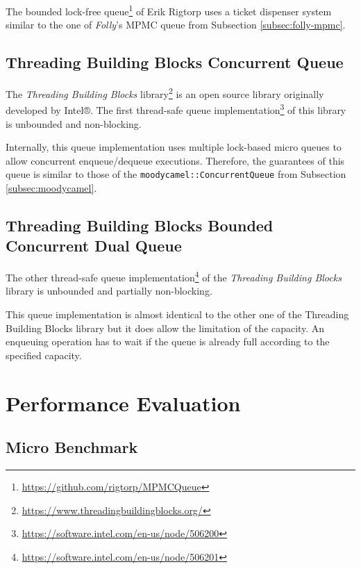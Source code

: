     The bounded lock-free queue\footnote{\url{https://github.com/rigtorp/MPMCQueue}} of Erik Rigtorp uses a ticket dispenser system similar to the one of \textit{Folly}'s MPMC queue from Subsection \ref{subsec:folly-mpmc}.

\subsection[TBB Concurrent Queue]{Threading Building Blocks Concurrent Queue} \label{subsec:intel-bounded}%

    The \textit{Threading Building Blocks} library\footnote{\url{https://www.threadingbuildingblocks.org/}} is an open source library originally developed by Intel®. The first thread-safe queue implementation\footnote{\url{https://software.intel.com/en-us/node/506200}} of this library is unbounded and non-blocking.

    Internally, this queue implementation uses multiple lock-based micro queues to allow concurrent enqueue/dequeue executions. Therefore, the guarantees of this queue is similar to those of the \lstinline{moodycamel::ConcurrentQueue} from Subsection \ref{subsec:moodycamel}.

\subsection[TBB Bounded Concurrent Queue]{Threading Building Blocks Bounded Concurrent Dual Queue} \label{subsec:intel-unbounded}%

    The other thread-safe queue implementation\footnote{\url{https://software.intel.com/en-us/node/506201}} of the \textit{Threading Building Blocks} library is unbounded and partially non-blocking.

    This queue implementation is almost identical to the other one of the Threading Building Blocks library but it does allow the limitation of the capacity. An enqueuing operation has to wait if the queue is already full according to the specified capacity.

\section[Performance Evaluation]{Performance Evaluation} \label{sec:free-list-performance}

\subsection[Micro Benchmark]{Micro Benchmark}


